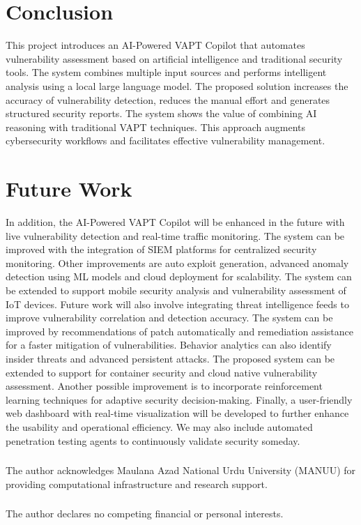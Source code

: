 \documentclass[runningheads]{llncs}
\begin{document}
\section{Conclusion}

This project introduces an AI-Powered VAPT Copilot that automates vulnerability assessment based on artificial intelligence and traditional security tools. The system combines multiple input sources and performs intelligent analysis using a local large language model. The proposed solution increases the accuracy of vulnerability detection, reduces the manual effort and generates structured security reports. The system shows the value of combining AI reasoning with traditional VAPT techniques. This approach augments cybersecurity workflows and facilitates effective vulnerability management.

\section{Future Work}

In addition, the AI-Powered VAPT Copilot will be enhanced in the future with live vulnerability detection and real-time traffic monitoring. The system can be improved with the integration of SIEM platforms for centralized security monitoring. Other improvements are auto exploit generation, advanced anomaly detection using ML models and cloud deployment for scalability. The system can be extended to support mobile security analysis and vulnerability assessment of IoT devices. Future work will also involve integrating threat intelligence feeds to improve vulnerability correlation and detection accuracy. The system can be improved by recommendations of patch automatically and remediation assistance for a faster mitigation of vulnerabilities. Behavior analytics can also identify insider threats and advanced persistent attacks. The proposed system can be extended to support for container security and cloud native vulnerability assessment. Another possible improvement is to incorporate reinforcement learning techniques for adaptive security decision-making. Finally, a user-friendly web dashboard with real-time visualization will be developed to further enhance the usability and operational efficiency. We may also include automated penetration testing agents to continuously validate security someday.

\begin{credits}
\subsubsection{\ackname}
The author acknowledges Maulana Azad National Urdu University (MANUU) for providing computational infrastructure and research support.

\subsubsection{\discintname}
The author declares no competing financial or personal interests.
\end{credits}
\end{document}
